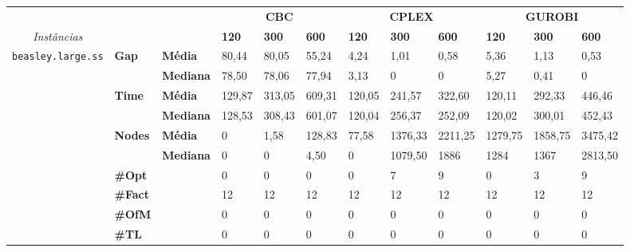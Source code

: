 
\begin{table}[]
	\begin{adjustbox}{angle=90}
	\begin{tabular}{cll|lll|lll|lll}
	& & & \multicolumn{3}{c}{\textbf{CBC}} & \multicolumn{3}{c}{\textbf{CPLEX}} & \multicolumn{3}{c}{\textbf{GUROBI}} 	\\\textit{Instâncias} & & & \textbf{120} & \textbf{300} & \textbf{600} & \textbf{120} & \textbf{300} & \textbf{600} & \textbf{120} & \textbf{300} & \textbf{600} \\
\hline
\multirow{7}{*}{\texttt{beasley.large.ss}} & \multirow{2}{*}{\textbf{Gap}} & \textbf{Média} & 80,44 & 80,05 & 55,24 & 4,24 & 1,01 & 0,58 & 5,36 & 1,13 & 0,53 \\
 & & \textbf{Mediana} & 78,50 & 78,06 & 77,94 & 3,13 & 0 & 0 & 5,27 & 0,41 & 0 \\
\cline{2-12}
 & \multirow{2}{*}{\textbf{Time}} & \textbf{Média} & 129,87 & 313,05 & 609,31 & 120,05 & 241,57 & 322,60 & 120,11 & 292,33 & 446,46 \\
 & & \textbf{Mediana} & 128,53 & 308,43 & 601,07 & 120,04 & 256,37 & 252,09 & 120,02 & 300,01 & 452,43 \\
\cline{2-12}
 & \multirow{2}{*}{\textbf{Nodes}} & \textbf{Média} & 0 & 1,58 & 128,83 & 77,58 & 1376,33 & 2211,25 & 1279,75 & 1858,75 & 3475,42 \\
 & & \textbf{Mediana} & 0 & 0 & 4,50 & 0 & 1079,50 & 1886 & 1284 & 1367 & 2813,50 \\
\cline{2-12}
 & \textbf{\#Opt} & & 0 & 0 & 0 & 0 & 7 & 9 & 0 & 3 & 9 \\
 & \textbf{\#Fact} & & 12 & 12 & 12 & 12 & 12 & 12 & 12 & 12 & 12 \\
 & \textbf{\#OfM} & & 0 & 0 & 0 & 0 & 0 & 0 & 0 & 0 & 0 \\
 & \textbf{\#TL} & & 0 & 0 & 0 & 0 & 0 & 0 & 0 & 0 & 0 \\
	\end{tabular}
	\end{adjustbox}
\end{table}


